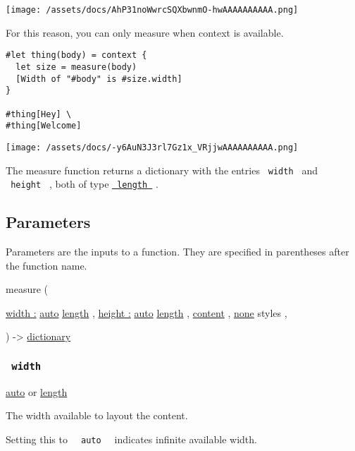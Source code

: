 \texttt{[image: /assets/docs/AhP31noWwrcSQXbwnmO-hwAAAAAAAAAA.png]}

For this reason, you can only measure when context is available.

\begin{verbatim}
#let thing(body) = context {
  let size = measure(body)
  [Width of "#body" is #size.width]
}

#thing[Hey] \
#thing[Welcome]
\end{verbatim}

\texttt{[image: /assets/docs/-y6AuN3J3rl7Gz1x\_VRjjwAAAAAAAAAA.png]}

The measure function returns a dictionary with the entries
\texttt{\ width\ } and \texttt{\ height\ } , both of type
\href{/docs/reference/layout/length/}{\texttt{\ length\ }} .

\subsection{\texorpdfstring{{ Parameters
}}{ Parameters }}\label{parameters}

\label{parameters-tooltip}
Parameters are the inputs to a function. They are specified in
parentheses after the function name.

{ measure } (

{ \hyperref[parameters-width]{width :}
\href{/docs/reference/foundations/auto/}{auto}
\href{/docs/reference/layout/length/}{length} , } {
\hyperref[parameters-height]{height :}
\href{/docs/reference/foundations/auto/}{auto}
\href{/docs/reference/layout/length/}{length} , } {
\href{/docs/reference/foundations/content/}{content} , } {
\href{/docs/reference/foundations/none/}{none} { styles } , }

) -\textgreater{}
\href{/docs/reference/foundations/dictionary/}{dictionary}

\subsubsection{\texorpdfstring{\texttt{\ width\ }}{ width }}\label{parameters-width}

\href{/docs/reference/foundations/auto/}{auto} {or}
\href{/docs/reference/layout/length/}{length}

The width available to layout the content.

Setting this to \texttt{\ }{\texttt{\ auto\ }}\texttt{\ } indicates
infinite available width.

